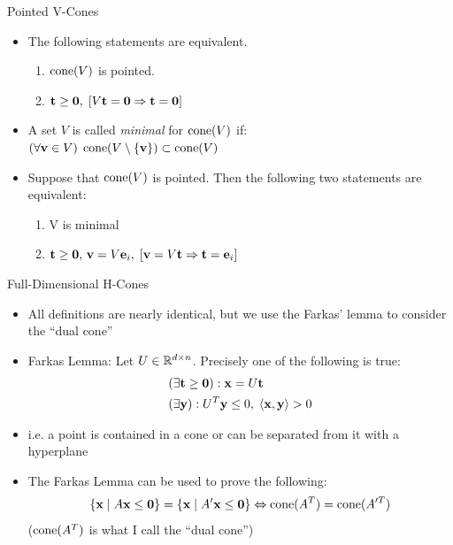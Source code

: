 \documentclass{beamer}
\begin{document}
\begin{frame}{Pointed V-Cones}
\begin{itemize}
  \item<1-> The following statements are equivalent.
    \begin{enumerate}
      \item $\operatorname{cone}(V)$ is pointed.
      \item $\mathbf{t}\geq\mathbf{0},\; [V\mathbf{t}=\mathbf{0} \Rightarrow \mathbf{t}=\mathbf{0}]$
    \end{enumerate}

  \item<2-> A set $V$ is called \textit{minimal} for $\operatorname{cone}(V)$ if:\\
  $(\forall \mathbf{v} \in V)\; \operatorname{cone}(V\setminus\{\mathbf{v}\}) \subset \operatorname{cone}(V)$

	\item<3-> Suppose that $\operatorname{cone}(V)$ is pointed.  Then the following two statements are equivalent:
	\begin{enumerate}
		\item V is minimal
		\item $\mathbf{t}\geq\mathbf{0},\,\mathbf{v}=V\mathbf{e}_i,\; [\mathbf{v}=V\mathbf{t} \Rightarrow \mathbf{t}=\mathbf{e}_i]$
	\end{enumerate}
\end{itemize}
\end{frame}

\begin{frame}{Full-Dimensional H-Cones}
\begin{itemize}
  \item<1-> All definitions are nearly identical, but we use the Farkas' lemma to consider the ``dual cone''
  \item<2-> Farkas Lemma:
    Let $U \in \mathbb{R}^{d\times n}$.  Precisely one of the following is true:
    \begin{align*}
       & (\exists \mathbf{t} \geq \mathbf{0}) : \mathbf{x} = U\mathbf{t}                \\
       & (\exists \mathbf{y}) : U^T\mathbf{y} \leq 0,\; \left\langle \mathbf{x}, \mathbf{y} \right\rangle > 0
    \end{align*}
  \item<3-> i.e. a point is contained in a cone or can be separated from it with a hyperplane
  \item<4-> The Farkas Lemma can be used to prove the following: 
    \[\left\{\mathbf{x}\;|\; A\mathbf{x}\leq\mathbf{0}\right\} = \left\{\mathbf{x}\;|\; A'\mathbf{x}\leq\mathbf{0}\right\} \Leftrightarrow \operatorname{cone}(A^T) = \operatorname{cone}(A'^T)\]
    ($\operatorname{cone}(A^T)$ is what I call the ``dual cone'')
\end{itemize}
\end{frame}
\end{document}
